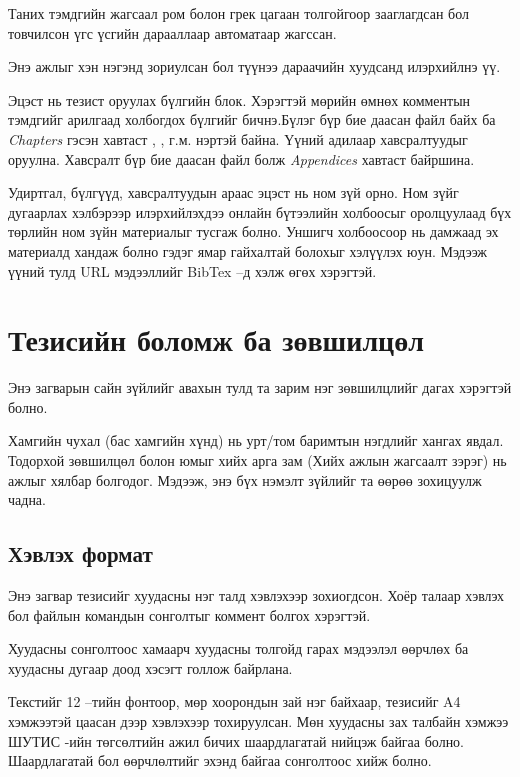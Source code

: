 Таних тэмдгийн жагсаал ром болон грек цагаан толгойгоор зааглагдсан бол товчилсон үгс үсгийн дарааллаар автоматаар жагссан. 

Энэ ажлыг хэн нэгэнд зориулсан бол түүнээ дараачийн хуудсанд илэрхийлнэ үү.

Эцэст нь тезист оруулах бүлгийн блок. Хэрэгтэй мөрийн өмнөх комментын тэмдгийг арилгаад холбогдох бүлгийг бичнэ.Бүлэг бүр бие даасан файл байх ба \emph{Chapters} гэсэн хавтаст , , г.м. нэртэй байна. Үүний адилаар хавсралтуудыг оруулна. Хавсралт бүр бие даасан файл болж \emph{Appendices} хавтаст байршина.

Удиртгал, бүлгүүд, хавсралтуудын араас эцэст нь ном зүй орно. Ном зүйг дугаарлах хэлбэрээр илэрхийлэхдээ онлайн бүтээлийн холбоосыг оролцуулаад бүх төрлийн ном зүйн материалыг тусгаж болно. Уншигч холбоосоор нь дамжаад эх материалд хандаж болно гэдэг ямар гайхалтай болохыг хэлүүлэх юун. Мэдээж үүний тулд URL мэдээллийг BibTex --д хэлж өгөх хэрэгтэй.


\section{Тезисийн боломж ба зөвшилцөл}\label{ThesisConventions}

Энэ загварын сайн зүйлийг авахын тулд та зарим нэг зөвшилцлийг дагах хэрэгтэй болно.

Хамгийн чухал (бас хамгийн хүнд) нь урт/том баримтын нэгдлийг хангах явдал. Тодорхой зөвшилцөл болон юмыг хийх арга зам (Хийх ажлын жагсаалт зэрэг) нь ажлыг хялбар болгодог. Мэдээж, энэ бүх нэмэлт зүйлийг та өөрөө зохицуулж чадна.

\subsection{Хэвлэх формат}

Энэ загвар тезисийг хуудасны нэг талд хэвлэхээр зохиогдсон. Хоёр талаар хэвлэх бол  файлын  командын  сонголтыг коммент болгох хэрэгтэй.

Хуудасны сонголтоос хамаарч хуудасны толгойд гарах мэдээлэл өөрчлөх ба хуудасны дугаар доод хэсэгт голлож байрлана.

Текстийг 12 --тийн фонтоор, мөр хоорондын зай нэг байхаар, тезисийг A4 хэмжээтэй цаасан дээр хэвлэхээр тохируулсан. Мөн хуудасны зах талбайн хэмжээ ШУТИС -ийн төгсөлтийн ажил бичих шаардлагатай нийцэж байгаа болно. Шаардлагатай бол өөрчлөлтийг  эхэнд байгаа сонголтоос хийж болно. 


